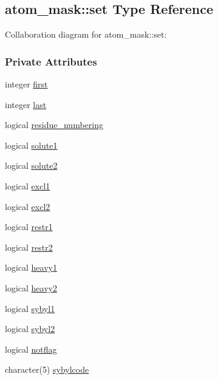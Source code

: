 \hypertarget{structatom__mask_1_1set}{\subsection{atom\-\_\-mask\-:\-:set Type Reference}
\label{structatom__mask_1_1set}
}


Collaboration diagram for atom\-\_\-mask\-:\-:set\-:
\subsubsection*{Private Attributes}
\begin{DoxyCompactItemize}
\item 
integer \hyperlink{structatom__mask_1_1set_ac6846c0279ec629afe32529292615f94}{first}
\item 
integer \hyperlink{structatom__mask_1_1set_a087852a694d74bf64e4e2127eb259ba9}{last}
\item 
logical \hyperlink{structatom__mask_1_1set_a0e682873dd673d765df9afbecc804ffc}{residue\-\_\-numbering}
\item 
logical \hyperlink{structatom__mask_1_1set_a34a813030a81c7629f614624b2e6f33e}{solute1}
\item 
logical \hyperlink{structatom__mask_1_1set_a1df9ca6df28706d84ce78156e149c725}{solute2}
\item 
logical \hyperlink{structatom__mask_1_1set_acf2309b82239a42e0039317fc08a3937}{excl1}
\item 
logical \hyperlink{structatom__mask_1_1set_aa328cccd9326b8ac3f4ef1a094679c72}{excl2}
\item 
logical \hyperlink{structatom__mask_1_1set_a2c4b759191a51cb32d81a6f5bacb885f}{restr1}
\item 
logical \hyperlink{structatom__mask_1_1set_ac51adab800a7dbb658901f599b56ab32}{restr2}
\item 
logical \hyperlink{structatom__mask_1_1set_a13ed4de30d98d1db0b07ee2bce1ef874}{heavy1}
\item 
logical \hyperlink{structatom__mask_1_1set_ac5a7a779d23bf3ed32366c397460a561}{heavy2}
\item 
logical \hyperlink{structatom__mask_1_1set_a6661bbfb05189a898ca262b17aec8878}{sybyl1}
\item 
logical \hyperlink{structatom__mask_1_1set_a6e2a778a6e01b643842132c78c8388dd}{sybyl2}
\item 
logical \hyperlink{structatom__mask_1_1set_a77aafa48b3f755a6c200383d8a87439c}{notflag}
\item 
character(5) \hyperlink{structatom__mask_1_1set_a9314f05f5b496a619a47be1830866484}{sybylcode}
\end{DoxyCompactItemize}


